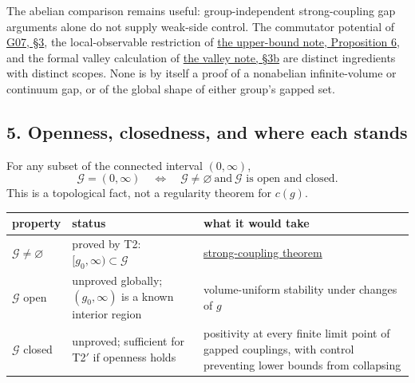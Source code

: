 \documentclass[11pt,a4paper]{article}
\begin{document}
The abelian comparison remains useful: group-independent strong-coupling
gap arguments alone do not supply weak-side control. The commutator
potential of \href{low-dimensional-mass-gap.md}{G07, §3}, the
local-observable restriction of \href{lattice-gap-upper-bounds.md}{the
upper-bound note, Proposition 6}, and the formal valley calculation of
\href{torus-valley-potential.md}{the valley note, §3b} are distinct
ingredients with distinct scopes. None is by itself a proof of a
nonabelian infinite-volume or continuum gap, or of the global shape of
either group's gapped set.

\subsection{5. Openness, closedness, and where each
stands}\label{openness-closedness-and-where-each-stands}

For any subset of the connected interval \((0,\infty)\),
\[\mathcal G=(0,\infty)\quad\Longleftrightarrow\quad
\mathcal G\ne\varnothing\ \text{and}\ \mathcal G\text{ is open and closed}.\]
This is a topological fact, not a regularity theorem for \(c(g)\).

\begin{longtable}[]{@{}
  >{\raggedright\arraybackslash}p{}
  >{\raggedright\arraybackslash}p{}
  >{\raggedright\arraybackslash}p{}@{}}
\toprule\noalign{}
\begin{minipage}[b]{\linewidth}\raggedright
property
\end{minipage} & \begin{minipage}[b]{\linewidth}\raggedright
status
\end{minipage} & \begin{minipage}[b]{\linewidth}\raggedright
what it would take
\end{minipage} \\
\midrule\noalign{}
\endhead
\bottomrule\noalign{}
\endlastfoot
\(\mathcal G\ne\varnothing\) & proved by T2:
\([g_0,\infty)\subset\mathcal G\) &
\href{strong-coupling-uniform-gap.md}{strong-coupling theorem} \\
\(\mathcal G\) open & unproved globally; \((g_0,\infty)\) is a known
interior region & volume-uniform stability under changes of \(g\) \\
\(\mathcal G\) closed & unproved; sufficient for T2\('\) if openness
holds & positivity at every finite limit point of gapped couplings, with
control preventing lower bounds from collapsing \\
\end{longtable}
\end{document}
